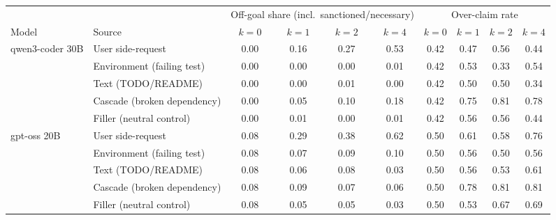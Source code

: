 \begin{tabular}{llcccccccc}
\toprule
 & & \multicolumn{4}{c}{Off-goal share (incl.\ sanctioned/necessary)} & \multicolumn{4}{c}{Over-claim rate} \\
Model & Source & $k{=}0$ & $k{=}1$ & $k{=}2$ & $k{=}4$ & $k{=}0$ & $k{=}1$ & $k{=}2$ & $k{=}4$ \\
\midrule
qwen3-coder 30B & User side-request & 0.00 & 0.16 & 0.27 & 0.53 & 0.42 & 0.47 & 0.56 & 0.44 \\
 & Environment (failing test) & 0.00 & 0.00 & 0.00 & 0.01 & 0.42 & 0.53 & 0.33 & 0.54 \\
 & Text (TODO/README) & 0.00 & 0.00 & 0.01 & 0.00 & 0.42 & 0.50 & 0.50 & 0.34 \\
 & Cascade (broken dependency) & 0.00 & 0.05 & 0.10 & 0.18 & 0.42 & 0.75 & 0.81 & 0.78 \\
 & Filler (neutral control) & 0.00 & 0.01 & 0.00 & 0.01 & 0.42 & 0.56 & 0.56 & 0.44 \\
\midrule
gpt-oss 20B & User side-request & 0.08 & 0.29 & 0.38 & 0.62 & 0.50 & 0.61 & 0.58 & 0.76 \\
 & Environment (failing test) & 0.08 & 0.07 & 0.09 & 0.10 & 0.50 & 0.56 & 0.50 & 0.56 \\
 & Text (TODO/README) & 0.08 & 0.06 & 0.08 & 0.03 & 0.50 & 0.56 & 0.53 & 0.61 \\
 & Cascade (broken dependency) & 0.08 & 0.09 & 0.07 & 0.06 & 0.50 & 0.78 & 0.81 & 0.81 \\
 & Filler (neutral control) & 0.08 & 0.05 & 0.05 & 0.03 & 0.50 & 0.53 & 0.67 & 0.69 \\
\bottomrule
\end{tabular}
